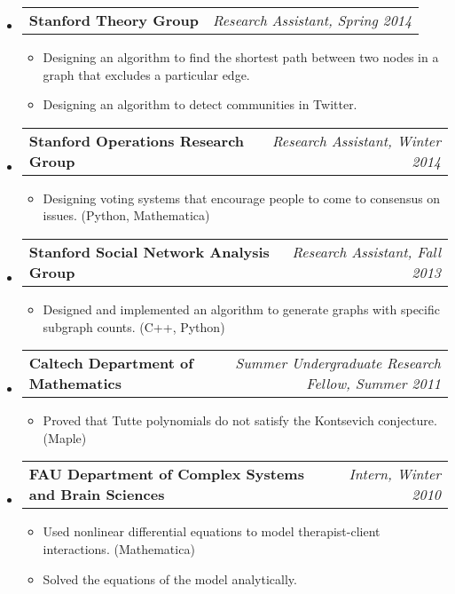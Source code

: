 \documentclass[letterpaper,10pt]{article}
\makeatletter
\newcommand{\resitem}[1]{\item #1 \vspace{-2pt}}
\newcommand{\ressubheading}[4]{
\begin{tabular*}{7.0in}{l@{\extracolsep{\fill}}r}
		\textbf{#1} & \textit{#4} \\
\end{tabular*}\vspace{-6pt}}
\makeatother
\begin{document}
\begin{itemize}
\item
	\ressubheading{Stanford Theory Group}{Stanford, CA}{Research Assistant}{Research Assistant, Spring 2014}
	\begin{itemize}
		\resitem{Designing an algorithm to find the shortest path between two nodes in a graph that excludes a particular edge.}
		\resitem{Designing an algorithm to detect communities in Twitter.}
	\end{itemize}
\item
	\ressubheading{Stanford Operations Research Group}{Stanford, CA}{Research Assistant}{Research Assistant, Winter 2014}
	\begin{itemize}
		\resitem{Designing voting systems that encourage people to come to consensus on issues.  (Python, Mathematica)}
	\end{itemize}
\item
	\ressubheading{Stanford Social Network Analysis Group}{Stanford, CA}{Research Assistant}{Research Assistant, Fall 2013}
	\begin{itemize}
		\resitem{Designed and implemented an algorithm to generate graphs with specific subgraph counts.  (C++, Python)}
	\end{itemize}


\item
	\ressubheading{Caltech Department of Mathematics}{Pasadena, CA}{Summer Undergraduate Research Fellow}{Summer Undergraduate Research Fellow, Summer 2011}
	\begin{itemize}
		\resitem{Proved that Tutte polynomials do not satisfy the Kontsevich conjecture.  (Maple)}
	\end{itemize}

\item
	\ressubheading{FAU Department of Complex Systems and Brain Sciences}{Boca Raton, FL}{Research Intern}{Intern, Winter 2010}
	\begin{itemize}
		\resitem{Used nonlinear differential equations to model therapist-client interactions.  (Mathematica)}
		\resitem{Solved the equations of the model analytically.}
	\end{itemize}


\end{itemize}
\end{document}
